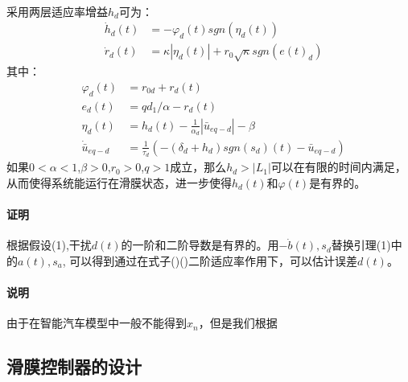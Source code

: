\documentclass{cjc}
\begin{document}
    \paragraph{}
    采用两层适应率增益$h_d$可为：
    \begin{eqnarray}
      &\dot{h}_d(t) &= - \varphi_d (t) sgn(\eta  _d(t))  \\
      &\dot{r}_d(t) &= \kappa |\eta_d (t)| + r_0 \sqrt{\kappa }sgn(e(t)_d)
    \end{eqnarray}
    其中：
    \begin{eqnarray}
      &\varphi_d (t) &= r_{0d} + r_d(t) \\
      &e_d(t)& = q d_1/\alpha  - r_d(t) \\
      &\eta_d  (t) &= h_d(t) - \frac{1}{\alpha_d}|\bar{u}_{eq-d}| - \beta \\
      &\dot{\bar{u}}_{eq-d} &= \frac{1}{\tau _d}(-(\delta_d + h_d )sgn(s_d)(t)-\bar{u}_{eq-d})
    \end{eqnarray}
    如果$0 <\alpha <1$,\quad $\beta >0$,\quad $r_0>0$,\quad$q>1$成立，那么$h_d > |L_1|$可以在有限的时间内满足，
    从而使得系统能运行在滑膜状态，进一步使得$h_d(t)$和$\varphi(t)$是有界的。
    
  \paragraph*{证明}
    根据假设(1),干扰$d(t)$的一阶和二阶导数是有界的。用$-\dot{b}(t),s_d$替换引理(1)中的$a(t),s_a$,
    可以得到通过在式子()(){\color{red}二阶适应率}作用下，可以估计误差$d(t)$。
  \paragraph*{说明}
    由于在智能汽车模型中一般不能得到$x_n$，但是我们根据
  \subsection{滑膜控制器的设计}



 




\end{document}
